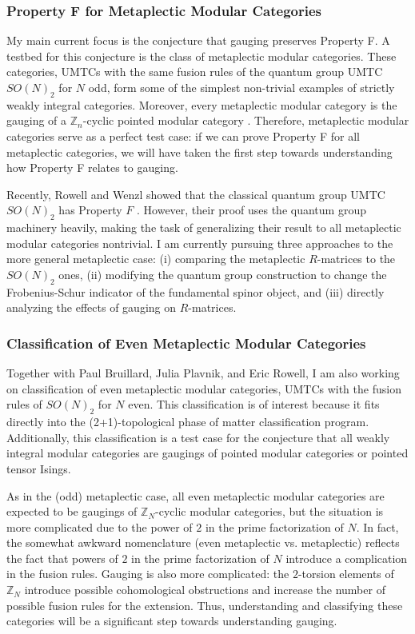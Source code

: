 \documentclass[12pt]{article}
\newcommand{\ZZ}{\mathbb{Z}}
\theoremstyle{plain} \numberwithin{equation}{section}
\theoremstyle{definition}
\begin{document}
\subsubsection*{Property F for Metaplectic Modular Categories}

My main current focus is the conjecture that gauging preserves Property F. A testbed for this conjecture is the class of metaplectic modular categories.  These categories, UMTCs with the same fusion rules of the quantum group UMTC $SO(N)_2$ for $N$ odd,  form some of the simplest non-trivial examples of strictly weakly integral categories.   Moreover, every metaplectic modular category is the gauging of a $\ZZ_n$-cyclic pointed modular category \cite{acrw}.  Therefore, metaplectic modular categories serve as a perfect test case:  if we can prove Property F for all metaplectic categories, we will have taken the first step towards understanding how Property F relates to gauging.  

Recently,  Rowell and Wenzl showed that the classical quantum group UMTC $SO(N)_2$ has Property $F$ \cite{rw}.  However, their proof uses the quantum group machinery heavily, making the task of generalizing their result to all metaplectic modular categories nontrivial.  I am currently pursuing three approaches  to the more general metaplectic case: (i) comparing the metaplectic $R$-matrices to the $SO(N)_2$ ones, (ii) modifying the quantum group construction to change the Frobenius-Schur indicator of the fundamental spinor object, and (iii) directly analyzing the effects of gauging on $R$-matrices.

\subsubsection*{Classification of Even Metaplectic Modular Categories}

Together with Paul Bruillard, Julia Plavnik, and Eric Rowell, I am also working on classification of even metaplectic modular categories, UMTCs with the fusion rules of $SO(N)_2$ for $N$ even. This classification is of interest because it fits directly into the (2+1)-topological phase of matter classification program.  Additionally, this classification is a test case for the conjecture that all weakly integral modular categories are gaugings of pointed modular categories or pointed tensor Isings.

As in the (odd) metaplectic case, all even metaplectic modular categories are expected to be gaugings of $\ZZ_{N}$-cyclic modular categories, but the situation is more complicated due to the power of $2$ in the prime factorization of $N$. In fact, the somewhat awkward nomenclature (even metaplectic vs. metaplectic) reflects the fact that powers of $2$ in the prime factorization of $N$ introduce a complication in the fusion rules.   Gauging is also more complicated: the $2$-torsion elements of $\ZZ_N$ introduce possible cohomological obstructions and increase the number of possible fusion rules for the extension.  Thus, understanding and classifying these categories will be a significant step towards understanding gauging.
\end{document}
